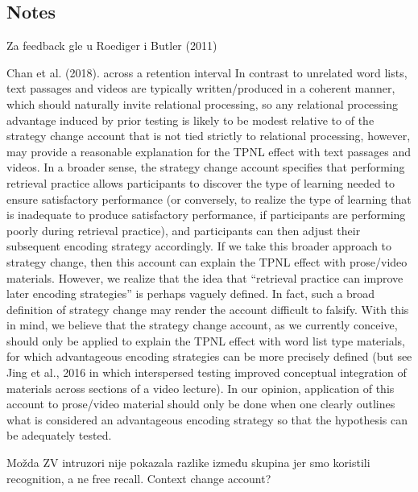 \documentclass[../main.tex]{subfiles}
\begin{document}
{
    \biblio
}

\subsection{Notes}



Za feedback gle u Roediger i Butler (2011)




Chan et al. (2018). across a retention interval
In contrast to unrelated word lists, text passages and videos are
typically written/produced in a coherent manner, which should naturally
invite relational processing, so any relational processing advantage
induced by prior testing is likely to be modest relative to
of the strategy change account that is not tied strictly to relational
processing, however, may provide a reasonable explanation for the
TPNL effect with text passages and videos. In a broader sense, the
strategy change account specifies that performing retrieval practice
allows participants to discover the type of learning needed to ensure
satisfactory performance (or conversely, to realize the type of learning
that is inadequate to produce satisfactory performance, if participants
are performing poorly during retrieval practice), and participants can
then adjust their subsequent encoding strategy accordingly. If we take
this broader approach to strategy change, then this account can explain
the TPNL effect with prose/video materials. However, we realize that
the idea that “retrieval practice can improve later encoding strategies”
is perhaps vaguely defined. In fact, such a broad definition of strategy
change may render the account difficult to falsify. With this in mind, we
believe that the strategy change account, as we currently conceive,
should only be applied to explain the TPNL effect with word list type
materials, for which advantageous encoding strategies can be more
precisely defined (but see Jing et al., 2016 in which interspersed testing
improved conceptual integration of materials across sections of a video
lecture). In our opinion, application of this account to prose/video
material should only be done when one clearly outlines what is considered
an advantageous encoding strategy so that the hypothesis can
be adequately tested.


Možda ZV intruzori nije pokazala razlike između skupina jer smo koristili recognition, a ne free recall.
Context change account?
\end{document}
